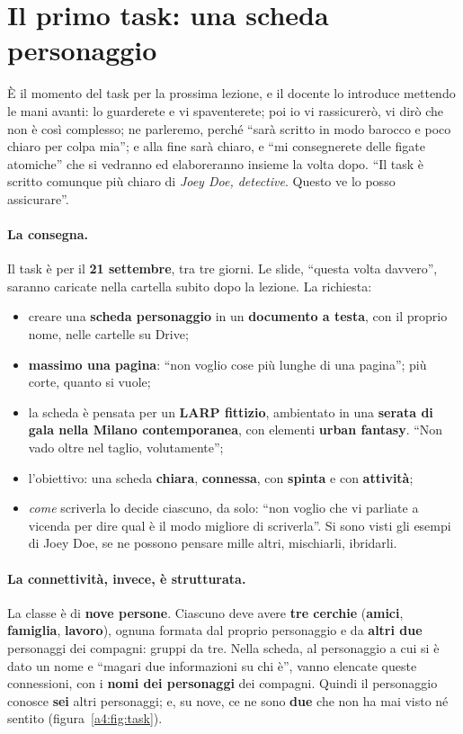 \section{Il primo task: una scheda personaggio}
\label{a4:sec:task}

È il momento del task per la prossima lezione, e il docente lo introduce mettendo le
mani avanti: lo guarderete e vi spaventerete; poi io vi rassicurerò, vi dirò che non
è così complesso; ne parleremo, perché ``sarà scritto in modo barocco e poco chiaro
per colpa mia''; e alla fine sarà chiaro, e ``mi consegnerete delle figate
atomiche'' che si vedranno ed elaboreranno insieme la volta dopo. ``Il task è
scritto comunque più chiaro di \emph{Joey Doe, detective}. Questo ve lo posso
assicurare''.

\paragraph{La consegna.} Il task è per il \textbf{21 settembre}, tra tre giorni. Le
slide, ``questa volta davvero'', saranno caricate nella cartella subito dopo la
lezione. La richiesta:
\begin{itemize}
  \item creare una \textbf{scheda personaggio} in un \textbf{documento a testa},
        con il proprio nome, nelle cartelle su Drive;
  \item \textbf{massimo una pagina}: ``non voglio cose più lunghe di una pagina'';
        più corte, quanto si vuole;
  \item la scheda è pensata per un \textbf{LARP fittizio}, ambientato in una
        \textbf{serata di gala nella Milano contemporanea}, con elementi
        \textbf{urban fantasy}. ``Non vado oltre nel taglio, volutamente'';
  \item l'obiettivo: una scheda \textbf{chiara}, \textbf{connessa}, con
        \textbf{spinta} e con \textbf{attività};
  \item \emph{come} scriverla lo decide ciascuno, da solo: ``non voglio che vi
        parliate a vicenda per dire qual è il modo migliore di scriverla''. Si sono
        visti gli esempi di Joey Doe, se ne possono pensare mille altri, mischiarli,
        ibridarli.
\end{itemize}

\paragraph{La connettività, invece, è strutturata.} La classe è di \textbf{nove
persone}. Ciascuno deve avere \textbf{tre cerchie} (\textbf{amici},
\textbf{famiglia}, \textbf{lavoro}), ognuna formata dal proprio personaggio e da
\textbf{altri due} personaggi dei compagni: gruppi da tre. Nella scheda, al
personaggio a cui si è dato un nome e ``magari due informazioni su chi è'', vanno
elencate queste connessioni, con i \textbf{nomi dei personaggi} dei compagni.
Quindi il personaggio conosce \textbf{sei} altri personaggi; e, su nove, ce ne sono
\textbf{due} che non ha mai visto né sentito (figura~\ref{a4:fig:task}).


